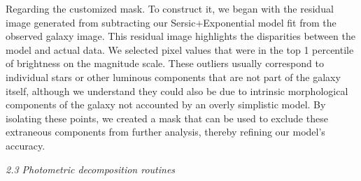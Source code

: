Regarding the customized mask. To construct it, we began with the residual image generated from subtracting our Sersic+Exponential model fit from the observed galaxy image. This residual image highlights the disparities between the model and actual data. We selected pixel values that were in the top 1 percentile of brightness on the magnitude scale. These outliers usually correspond to individual stars or other luminous components that are not part of the galaxy itself, although we understand they could also be due to intrinsic morphological components of the galaxy not accounted by an overly simplistic model. By isolating these points, we created a mask that can be used to exclude these extraneous components from further analysis, thereby refining our model's accuracy.

\vspace{0.1in}
{\noindent\large\textcolor{ullpurple}{\textit{2.3 Photometric decomposition routines}}}
\vspace{0.1in}

